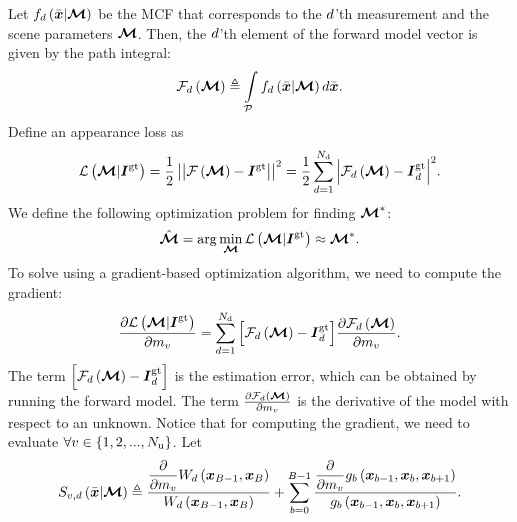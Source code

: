 \documentclass{article}
\begin{document}
Let $f_{d}\left({\Bar{\boldsymbol{x}}|\boldsymbol{\mathcal{M}}}\right)$ be the \ac{MCF} that corresponds to the $d$'th measurement and the scene parameters $\boldsymbol{\mathcal{M}}$. Then, the $d$'th element of the forward model vector is given by the path integral:
\begin{equation}
\label{eq:forward_model}
\forwardmodel_{\nm}\regpar{\sceneparam}\triangleq\intop_{\pathset}{\contfunc_{\nm}\regpar{\ppath|\sceneparam}d\ppath}.
\end{equation}
Define an appearance loss as
\begin{equation}
\label{eq:appearance_loss}
\mathcal{L}\left({\boldsymbol{\mathcal{M}}|\boldsymbol{I}^{\text{gt}}}\right)=\frac{1}{2}\left|\left| {\mathcal{F}\left({\boldsymbol{\mathcal{M}}}\right) - \boldsymbol{I}^{\text{gt}}} \right|\right| ^2
= \frac{1}{2}\sum_{d=1}^{N_{\text{d}}}{\left| {\mathcal{F}_{d}\left({{\boldsymbol{\mathcal{M}}}}\right)-\boldsymbol{I}^{\text{gt}}_{d}} \right|^2}.
\end{equation}
We define the following optimization problem for finding $\boldsymbol{\mathcal{M}}^*$:
\begin{equation}
\label{eq:opt_problem}
 \Hat{\boldsymbol{\mathcal{M}}}=\arg\min_{\boldsymbol{\mathcal{M}}}{\mathcal{L}\left({\boldsymbol{\mathcal{M}}|\boldsymbol{I}^{\text{gt}}}\right)}\approx\boldsymbol{\mathcal{M}}^* .
\end{equation}
To solve \eq{\ref{eq:opt_problem}} using a gradient-based optimization algorithm, we need to compute the gradient:
\begin{equation}
\label{eq:loss_derivative}
\frac{\partial \mathcal{L}\left({\boldsymbol{\mathcal{M}}|\boldsymbol{I}^{\text{gt}}}\right)}{\partial m_{v}} = \sum_{d=1}^{N_{\text{d}}}{\left[{\mathcal{F}_{d}\left({{\boldsymbol{\mathcal{M}}}}\right)-\boldsymbol{I}^{\text{gt}}_{d}}\right]}\frac{\partial \mathcal{F}_{d}\left({\boldsymbol{\mathcal{M}}}\right)}{\partial m_{v}}.
\end{equation}
The term $\left[{\mathcal{F}_{d}\left({{\boldsymbol{\mathcal{M}}}}\right)-\boldsymbol{I}^{\text{gt}}_{d}}\right]$ is the estimation error, which can be obtained by running the forward model. The term $\frac{\partial \mathcal{F}_{d}\left({\boldsymbol{\mathcal{M}}}\right)}{\partial m_{v}}$ is the derivative of the model with respect to an unknown. Notice that for computing the gradient, we need to evaluate \eq{\ref{eq:loss_derivative}}  $\forall v\in\left\{ {1,2,...,N_{\text{u}}}\right\}$. Let
\begin{equation}
\label{eq:total_derivative_factor}
S_{v, d}\left({\Bar{\boldsymbol{x}}|\boldsymbol{\mathcal{M}}}\right) \triangleq \frac{\dfrac{\partial}{\partial {m_{v}}} W_{d}\left({\boldsymbol{x}_{B-1},\boldsymbol{x}_{B}}\right)}{ W_{d}\left({\boldsymbol{x}_{B-1},\boldsymbol{x}_{B}}\right)}+ \sum_{b=0}^{B-1}{\frac{\dfrac{\partial}{\partial {m_{v}}}g_{b}\left({\boldsymbol{x}_{b-1}, \boldsymbol{x}_{b}, \boldsymbol{x}_{b+1}}\right)}{g_{b}\left({\boldsymbol{x}_{b-1}, \boldsymbol{x}_{b}, \boldsymbol{x}_{b+1}}\right)}}.
\end{equation}
\end{document}
